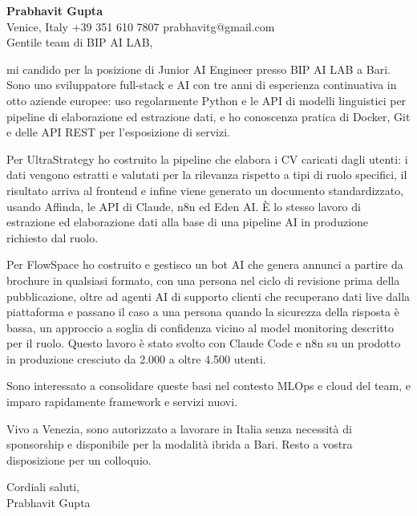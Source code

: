 \documentclass[a4paper,10.5pt]{article}
\begin{document}
\textbf{Prabhavit Gupta}\\
Venice, Italy \textbar{} +39 351 610 7807 \textbar{} prabhavitg@gmail.com\\[10pt]
Gentile team di BIP AI LAB,

mi candido per la posizione di Junior AI Engineer presso BIP AI LAB a Bari. Sono uno sviluppatore full-stack e AI con tre anni di esperienza continuativa in otto aziende europee: uso regolarmente Python e le API di modelli linguistici per pipeline di elaborazione ed estrazione dati, e ho conoscenza pratica di Docker, Git e delle API REST per l'esposizione di servizi.

Per UltraStrategy ho costruito la pipeline che elabora i CV caricati dagli utenti: i dati vengono estratti e valutati per la rilevanza rispetto a tipi di ruolo specifici, il risultato arriva al frontend e infine viene generato un documento standardizzato, usando Affinda, le API di Claude, n8n ed Eden AI. È lo stesso lavoro di estrazione ed elaborazione dati alla base di una pipeline AI in produzione richiesto dal ruolo.

Per FlowSpace ho costruito e gestisco un bot AI che genera annunci a partire da brochure in qualsiasi formato, con una persona nel ciclo di revisione prima della pubblicazione, oltre ad agenti AI di supporto clienti che recuperano dati live dalla piattaforma e passano il caso a una persona quando la sicurezza della risposta è bassa, un approccio a soglia di confidenza vicino al model monitoring descritto per il ruolo. Questo lavoro è stato svolto con Claude Code e n8n su un prodotto in produzione cresciuto da 2.000 a oltre 4.500 utenti.

Sono interessato a consolidare queste basi nel contesto MLOps e cloud del team, e imparo rapidamente framework e servizi nuovi.

Vivo a Venezia, sono autorizzato a lavorare in Italia senza necessità di sponsorship e disponibile per la modalità ibrida a Bari. Resto a vostra disposizione per un colloquio.

Cordiali saluti,\\
Prabhavit Gupta
\end{document}
